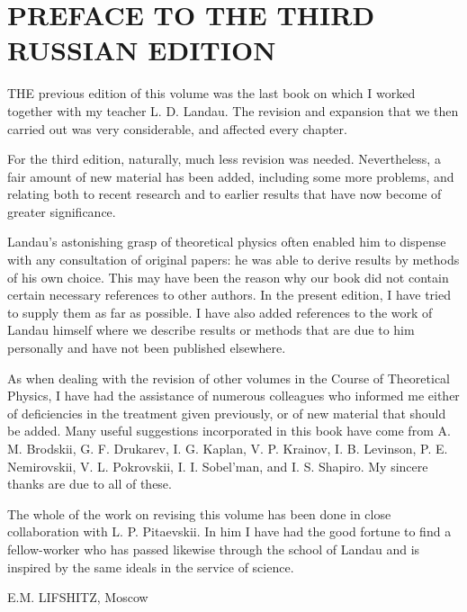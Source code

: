 \chapter{PREFACE TO THE THIRD RUSSIAN EDITION}
THE previous edition of this volume was the last book on which I worked together with my teacher L. D. Landau. The revision and expansion that we then carried out was very considerable, and affected every chapter.

For the third edition, naturally, much less revision was needed. Nevertheless, a fair amount of new material has been added, including some more problems, and relating both to recent research and to earlier results that have now become of greater significance.

Landau’s astonishing grasp of theoretical physics often enabled him to dispense with any consultation of original papers: he was able to derive results by methods of his own choice. This may have been the reason why our book did not contain certain necessary references to other authors. In the present edition, I have tried to supply them as far as possible. I have also added references to the work of Landau himself where we describe results or methods that are due to him personally and have not been published elsewhere.

As when dealing with the revision of other volumes in the Course of Theoretical Physics, I have had the assistance of numerous colleagues who informed me either of deficiencies in the treatment given previously, or of new material that should be added. Many useful suggestions incorporated in this book have come from A. M. Brodskii, G. F. Drukarev, I. G. Kaplan, V. P. Krainov, I. B. Levinson, P. E. Nemirovskii, V. L. Pokrovskii, I. I. Sobel’man, and I. S. Shapiro. My sincere thanks are due to all of these.

The whole of the work on revising this volume has been done in close collaboration with L. P. Pitaevskii. In him I have had the good fortune to find a fellow-worker who has passed likewise through the school of Landau and is inspired by the same ideals in the service of science.

\vspace{4ex}
\noindent E.M. LIFSHITZ, Moscow



\noindent\date{November 1973}